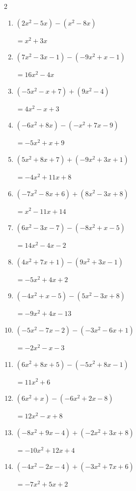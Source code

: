 \begin{multicols}{2}
\begin{enumerate}
        $=-x^{2}-2x-4$

  \item $(2x^{2}-5x)-(x^{2}-8x)$

        $=x^{2}+3x$

  \item $(7x^{2}-3x-1)-(-9x^{2}+x-1)$

        $=16x^{2}-4x$

  \item $(-5x^{2}-x+7)+(9x^{2}-4)$

        $=4x^{2}-x+3$

  \item $(-6x^{2}+8x)-(-x^{2}+7x-9)$

        $=-5x^{2}+x+9$

  \item $(5x^{2}+8x+7)+(-9x^{2}+3x+1)$

        $=-4x^{2}+11x+8$

  \item $(-7x^{2}-8x+6)+(8x^{2}-3x+8)$

        $=x^{2}-11x+14$

  \item $(6x^{2}-3x-7)-(-8x^{2}+x-5)$

        $=14x^{2}-4x-2$

  \item $(4x^{2}+7x+1)-(9x^{2}+3x-1)$

        $=-5x^{2}+4x+2$

  \item $(-4x^{2}+x-5)-(5x^{2}-3x+8)$

        $=-9x^{2}+4x-13$

  \item $(-5x^{2}-7x-2)-(-3x^{2}-6x+1)$

        $=-2x^{2}-x-3$

  \item $(6x^{2}+8x+5)-(-5x^{2}+8x-1)$

        $=11x^{2}+6$

  \item $(6x^{2}+x)-(-6x^{2}+2x-8)$

        $=12x^{2}-x+8$

  \item $(-8x^{2}+9x-4)+(-2x^{2}+3x+8)$

        $=-10x^{2}+12x+4$

  \item $(-4x^{2}-2x-4)+(-3x^{2}+7x+6)$

        $=-7x^{2}+5x+2$


\end{enumerate}
\end{multicols}
